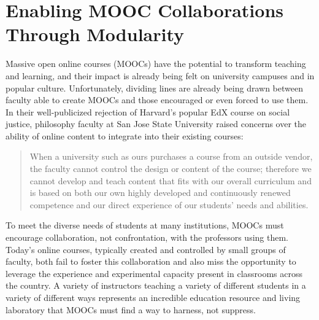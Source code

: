 

\def\thetitle{Enabling MOOC Collaborations Through Modularity}
\def\shorttitle{Modular MOOCs}
\def\theauthors{Geoffrey Challen (\textit{University at Buffalo}) and Margo
Seltzer (\textit{Harvard University})}
\def\shortauthors{Challen}
\def\submissiondate{\today}
\def\whitepapername{Learning with MOOCs}


\pagestyle{whitepaper}
\thispagestyle{emptywhitepaper}

\chapter{\thetitle}

Massive open online courses (MOOCs) have the potential to transform teaching
and learning, and their impact is already being felt on university campuses
and in popular culture. Unfortunately, dividing lines are already being drawn
between faculty able to create MOOCs and those encouraged or even forced to
use them. In their well-publicized rejection of Harvard's popular EdX course
on social justice, philosophy faculty at San Jose State University raised
concerns over the ability of online content to integrate into their existing
courses:

\begin{quote}

When a university such as ours purchases a course from an outside vendor, the
faculty cannot control the design or content of the course; therefore we
cannot develop and teach content that fits with our overall curriculum and is
based on both our own highly developed and continuously renewed competence
and our direct experience of our students' needs and abilities.

\end{quote}

To meet the diverse needs of students at many institutions, MOOCs must
encourage collaboration, not confrontation, with the professors using them.
Today's online courses, typically created and controlled by small groups of
faculty, both fail to foster this collaboration and also miss the opportunity
to leverage the experience and experimental capacity present in classrooms
across the country. A variety of instructors teaching a variety of different
students in a variety of different ways represents an incredible education
resource and living laboratory that MOOCs must find a way to harness, not
suppress.

